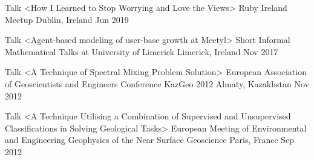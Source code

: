 

\begin{cventries}

  \cventry
    {Talk <How I Learned to Stop Worrying and Love the Views>} %
    {Ruby Ireland Meetup} %
    {Dublin, Ireland} %
    {Jun 2019} %
    {}

  \cventry
    {Talk <Agent-based modeling of user-base growth at Meetyl>} %
    {Short Informal Mathematical Talks at University of Limerick} %
    {Limerick, Ireland} %
    {Nov 2017} %
    {}

  \cventry
    {Talk <A Technique of Spectral Mixing Problem Solution>} %
    {European Association of Geoscientists and Engineers Conference KazGeo 2012} %
    {Almaty, Kazakhstan} %
    {Nov 2012} %
    {}

  \cventry
    {Talk <A Technique Utilising a Combination of Supervised and Unsupervised Classifications in Solving Geological Tasks>} %
    {European Meeting of Environmental and Engineering Geophysics of the Near Surface Geoscience} %
    {Paris, France} %
    {Sep 2012} %
    {}

\end{cventries}

